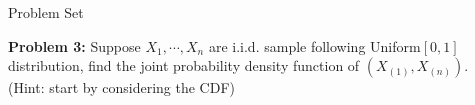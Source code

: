 \documentclass [aspectratio=169]{beamer}
\begin{document}

\begin{frame}{Problem Set}

   \textbf{Problem 3:} Suppose $X_1, \cdots, X_n$ are i.i.d. sample following Uniform$[0,1]$ distribution, find the joint probability density function of $(X_{(1)}, X_{(n)})$.
  \\
  (Hint: start by considering the CDF)

\end{frame}
\end{document}
